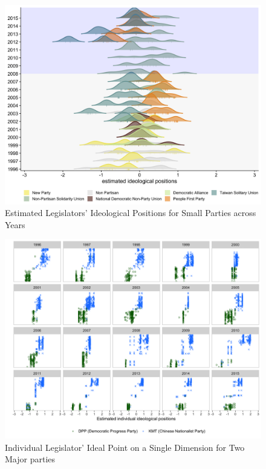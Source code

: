 \begin{figure}[H]
\caption{Estimated Legislators' Ideological Positions for Small Parties across Years\label{fig:term-plot}}
\centering{}\includegraphics[scale=0.15]{02-Chapter-Two/image/minor_postions_year}
\end{figure}

\begin{figure}[H]
\caption{Individual Legislator' Ideal Point on a Single Dimension
for Two Major parties \label{fig:individual_point}}\centering{}\includegraphics[scale=0.14]{02-Chapter-Two/image/individual_point}
\end{figure}

